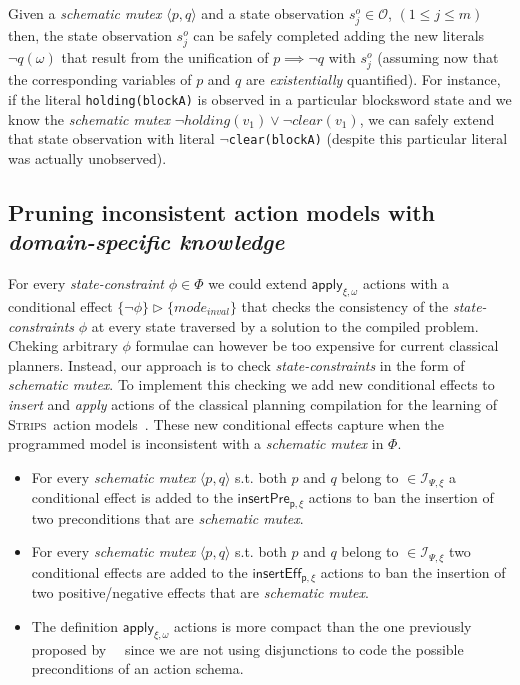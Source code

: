 \documentclass{article}
\newcommand{\tup}[1]{{\langle #1 \rangle}}
\newcommand{\strips}{\textsc{Strips}}
\begin{document}
Given a {\em schematic mutex} $\tup{p,q}$ and a state observation $s_j^o\in \mathcal{O}$, {\small $(1\leq j\leq m)$} then, the state observation $s_j^o$ can be safely completed adding the new literals $\neg q(\omega)$ that result from the unification of $p\implies \neg q$ with $s_j^o$ (assuming now that the corresponding variables of $p$ and $q$ are {\em existentially} quantified). For instance, if the literal {\tt\small holding(blockA)} is observed in a particular blocksword state and we know the {\em schematic mutex} $\neg holding(v_1)\vee\neg clear(v_1)$, we can safely extend that state observation with literal {\tt\small $\neg$clear(blockA)} (despite this particular literal was actually unobserved).


\subsection{Pruning inconsistent action models with {\em domain-specific knowledge}}
For every {\em state-constraint} $\phi\in\Phi$ we could extend $\mathsf{apply_{\xi,\omega}}$ actions with a conditional effect $\{\neg\phi\}\rhd\{mode_{inval}\}$ that checks the consistency of the {\em state-constraints} $\phi$ at every state traversed by a solution to the compiled problem. Cheking arbitrary $\phi$ formulae can however be too expensive for current classical planners. Instead, our approach is to check {\em state-constraints} in the form of {\em schematic mutex}. To implement this checking we add new conditional effects to {\em insert} and {\em apply} actions of the classical planning compilation for the learning of \strips\ action models~\cite{aineto2018learning}. These new conditional effects capture when the programmed model is inconsistent with a {\em schematic mutex} in $\Phi$. 
\begin{itemize}
\item For every {\em schematic mutex} $\tup{p,q}$ s.t. both $p$ and $q$ belong to $\in{\mathcal I}_{\Psi,\xi}$ a conditional effect is added to the $\mathsf{insertPre_{p,\xi}}$ actions to ban the insertion of two preconditions that are {\em schematic mutex}.
\item For every {\em schematic mutex} $\tup{p,q}$ s.t. both $p$ and $q$ belong to $\in{\mathcal I}_{\Psi,\xi}$ two conditional effects are added to the $\mathsf{insertEff_{p,\xi}}$ actions to ban the insertion of two positive/negative effects that are {\em schematic mutex}.
\item The definition $\mathsf{apply_{\xi,\omega}}$ actions is more compact than the one previously proposed by~\citeauthor{aineto2018learning}~\citeyear{aineto2018learning} since we are not using disjunctions to code the possible preconditions of an action schema.
\end{itemize}
\end{document}
